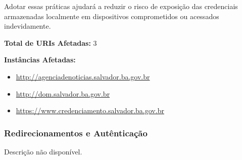 \documentclass[a4paper,12pt]{article}
\begin{document}
\begin{enumerate}
Adotar essas práticas ajudará a reduzir o risco de exposição das credenciais armazenadas localmente em dispositivos comprometidos ou acessados indevidamente.

\textbf{Total de URIs Afetadas:} 3

\textbf{Instâncias Afetadas:}
\begin{itemize}
    \item \url{http://agenciadenoticias.salvador.ba.gov.br}
    \item \url{http://dom.salvador.ba.gov.br}
    \item \url{https://www.credenciamento.salvador.ba.gov.br}
\end{itemize}

\end{enumerate}
\subsubsection{Redirecionamentos e Autênticação}
Descrição não disponível.
\end{document}
